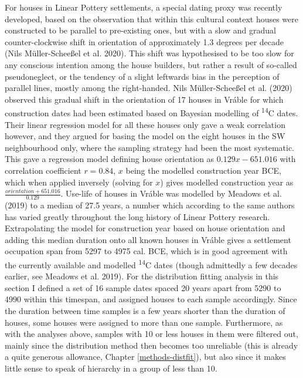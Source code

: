 \documentclass[
  12pt,
  a4paper, twoside]{book}
\begin{document}
For houses in Linear Pottery settlements, a special dating proxy was recently developed, based on the observation that within this cultural context houses were constructed to be parallel to pre-existing ones, but with a slow and gradual counter-clockwise shift in orientation of approximately 1.3 degrees per decade (Nils Müller-Scheeßel et al. 2020). This shift was hypothesised to be too slow for any conscious intention among the house builders, but rather a result of so-called pseudoneglect, or the tendency of a slight leftwards bias in the perception of parallel lines, mostly among the right-handed. Nils Müller-Scheeßel et al. (2020) observed this gradual shift in the orientation of 17 houses in Vráble for which construction dates had been estimated based on Bayesian modelling of \textsuperscript{14}C dates. Their linear regression model for all these houses only gave a weak correlation however, and they argued for basing the model on the eight houses in the SW neighbourhood only, where the sampling strategy had been the most systematic. This gave a regression model defining house orientation as \(0.129x - 651.016\) with correlation coefficient \(r = 0.84\), \(x\) being the modelled construction year BCE, which when applied inversely (solving for \(x\)) gives modelled construction year as \(\frac{orientation + 651.016}{0.129}\). Use-life of houses in Vráble was modelled by Meadows et al. (2019) to a median of 27.5 years, a number which according to the same authors has varied greatly throughout the long history of Linear Pottery research. Extrapolating the model for construction year based on house orientation and adding this median duration onto all known houses in Vráble gives a settlement occupation span from 5297 to 4975 cal. BCE, which is in good agreement with the currently available and modelled \textsuperscript{14}C dates (though admittedly a few decades earlier, see Meadows et al. 2019). For the distribution fitting analysis in this section I defined a set of 16 sample dates spaced 20 years apart from 5290 to 4990 within this timespan, and assigned houses to each sample accordingly. Since the duration between time samples is a few years shorter than the duration of houses, some houses were assigned to more than one sample. Furthermore, as with the analyses above, samples with 10 or less houses in them were filtered out, mainly since the distribution method then becomes too unreliable (this is already a quite generous allowance, Chapter \ref{methods-distfit}), but also since it makes little sense to speak of hierarchy in a group of less than 10.
\end{document}
